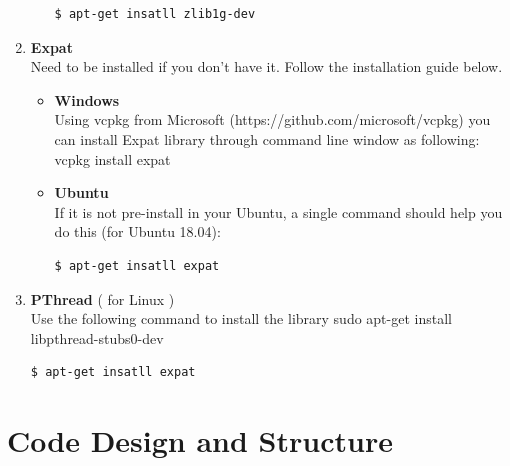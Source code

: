 \documentclass[a4paper, 12pt, english]{book}
\begin{document}
\begin{enumerate}
\begin{itemize}[noitemsep]
		\begin{lstlisting}[language=bash]
$ apt-get insatll zlib1g-dev
		\end{lstlisting}
		\end{itemize}
	\item {\textbf{Expat}}\\
	Need to be installed if you don't have it. Follow the installation guide below.
	\begin{itemize}[noitemsep]
	\item {\textbf{Windows}} \\
	Using vcpkg from Microsoft (https://github.com/microsoft/vcpkg)
		you can install Expat library through command line window as following:\\
		vcpkg install expat
	\item {\textbf{Ubuntu}} \\
	If it is not pre-install in your Ubuntu, a single command 
	should help you do this (for Ubuntu 18.04):
	\begin{lstlisting}[language=bash]
$ apt-get insatll expat
	\end{lstlisting}
	\end{itemize}
	\item {\textbf{PThread}} ( for Linux ) \\
	Use the following command to install the library
	sudo apt-get install libpthread-stubs0-dev
	\begin{lstlisting}[language=bash]
$ apt-get insatll expat
	\end{lstlisting}
	
\end{enumerate}








\chapter{Code Design and Structure}
\end{document}
